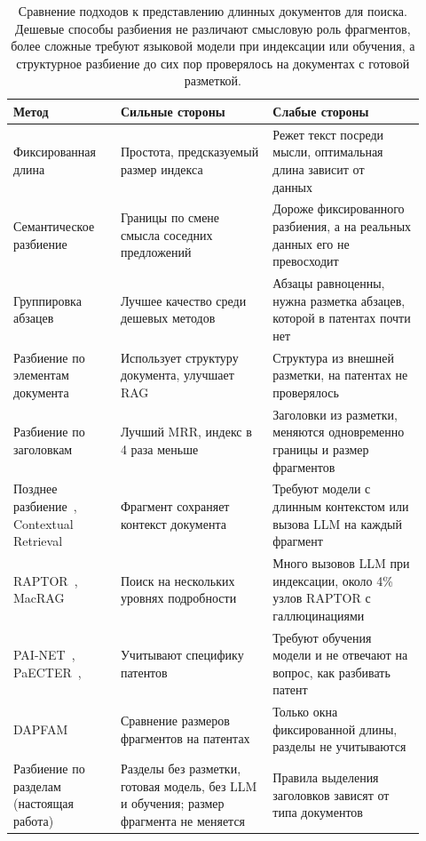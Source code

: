 \documentclass{article}
\begin{document}
\begin{table}[t]
    \centering
    \small
    \caption{Сравнение подходов к представлению длинных документов для поиска. Дешевые способы разбиения не различают смысловую роль фрагментов, более сложные требуют языковой модели при индексации или обучения, а структурное разбиение до сих пор проверялось на документах с готовой разметкой.}
    \label{tab:rw}
    \begin{tabular}{>{\raggedright\arraybackslash}p{0.24\linewidth}>{\raggedright\arraybackslash}p{0.34\linewidth}>{\raggedright\arraybackslash}p{0.34\linewidth}}
        \toprule
        Метод & Сильные стороны & Слабые стороны \\
        \midrule
        Фиксированная длина~\citep{shaukat2026chunking} & Простота, предсказуемый размер индекса & Режет текст посреди мысли, оптимальная длина зависит от данных~\citep{bhat2025chunksize} \\
        Семантическое разбиение~\citep{qu2025semantic} & Границы по смене смысла соседних предложений & Дороже фиксированного разбиения, а на реальных данных его не превосходит \\
        Группировка абзацев~\citep{shaukat2026chunking} & Лучшее качество среди дешевых методов & Абзацы равноценны, нужна разметка абзацев, которой в патентах почти нет \\
        Разбиение по элементам документа~\citep{jimenoyepes2024financial} & Использует структуру документа, улучшает RAG & Структура из внешней разметки, на патентах не проверялось \\
        Разбиение по заголовкам~\citep{taiwo2026oilgas} & Лучший MRR, индекс в 4 раза меньше & Заголовки из разметки, меняются одновременно границы и размер фрагментов \\
        Позднее разбиение~\citep{gunther2024late}, Contextual Retrieval~\citep{anthropic2024contextual} & Фрагмент сохраняет контекст документа & Требуют модели с длинным контекстом или вызова LLM на каждый фрагмент \\
        RAPTOR~\citep{sarthi2024raptor}, MacRAG~\citep{lim2025macrag} & Поиск на нескольких уровнях подробности & Много вызовов LLM при индексации, около 4\% узлов RAPTOR с галлюцинациями \\
        PAI-NET~\citep{lee2025painet}, PaECTER~\citep{ghosh2024paecter}, \citep{zuo2026patent} & Учитывают специфику патентов & Требуют обучения модели и не отвечают на вопрос, как разбивать патент \\
        DAPFAM~\citep{ayaou2025dapfam} & Сравнение размеров фрагментов на патентах & Только окна фиксированной длины, разделы не учитываются \\
        \midrule
        Разбиение по разделам (настоящая работа) & Разделы без разметки, готовая модель, без LLM и обучения; размер фрагмента не меняется & Правила выделения заголовков зависят от типа документов \\
        \bottomrule
    \end{tabular}
\end{table}
\end{document}
